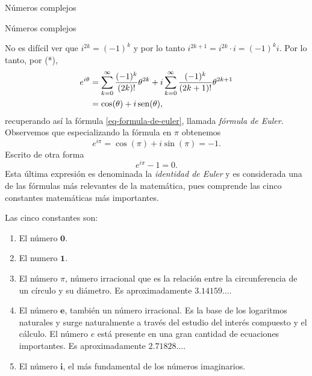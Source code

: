 \begin{chapter}{N\'umeros complejos}
\begin{section}{N\'umeros complejos}
\begin{observacion*}
        No es difícil ver que $i^{2k} = (-1)^k$ y por lo tanto $i^{2k+1} = i^{2k}\cdot i = (-1)^ki $. Por lo tanto, por (*), 
        \begin{align*}
            e^{i\theta} &=  \sum_{k=0}^{\infty} \frac{(-1)^k}{(2k)!}\theta^{2k}  + i\sum_{k=0}^{\infty} \frac{ (-1)^k}{(2k+1)!}\theta^{2k+1} \\
            &=\cos(\theta) + i \operatorname{sen}(\theta), 
        \end{align*}
        recuperando así  la fórmula \eqref{eq-formula-de-euler}, llamada \emph{fórmula de Euler.} Observemos que especializando la fórmula en $\pi$ obtenemos 
        \begin{equation*}
                e^{i\pi} = \cos(\pi) + i\sin(\pi) = -1.
        \end{equation*}
        Escrito de otra forma
        \begin{equation}
            e^{i\pi} -1 =0.
        \end{equation}
        Esta última expresión es denominada la \emph{identidad de Euler} y es considerada una de las fórmulas más relevantes de la matemática, pues comprende las cinco constantes matemáticas más importantes. 
        
        Las cinco constantes son:
        \begin{enumerate}
            \item El número $\mathbf 0$.
            \item El numero $\mathbf 1$.
            \item El número ${\pi}$, número irracional  que es la relación entre la circunferencia de un círculo y su diámetro. Es aproximadamente $3.14159\ldots$.
            \item El número $\mathbf e$, también un número irracional. Es la base de los logaritmos naturales y surge naturalmente a través del estudio del interés compuesto y el cálculo. El número $e$ está presente en una gran cantidad de ecuaciones importantes. Es aproximadamente $2.71828\ldots$.
            \item El número $\mathbf i$, el más fundamental de los números imaginarios.
            
        \end{enumerate}
        
        
        \end{observacion*}
        
        
        
    \end{section}	
    \end{chapter}




